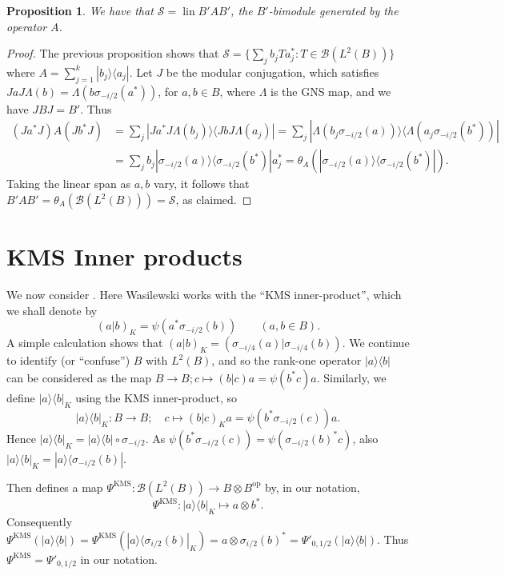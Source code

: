 \documentclass[a4paper,11pt]{article}
\theoremstyle{plain}
\newtheorem{proposition}{Proposition}[section]
\theoremstyle{remark}
\newcommand{\mc}[1]{\mathcal{#1}}
\newcommand{\lin}{\operatorname{lin}}
\newcommand{\op}{{\operatorname{op}}}
\newcommand{\KMS}{\textrm{KMS}}
\begin{document}
\begin{proposition}\label{prop:S_is_bimod_A}
We have that $\mc S = \lin B' A B'$, the $B'$-bimodule generated by the operator $A$.
\end{proposition}
\begin{proof}
The previous proposition shows that $\mc S = \{ \sum_j b_j T a_j^* : T\in\mc B(L^2(B)) \}$ where $A = \sum_{j=1}^k | b_j \rangle \langle a_j |$.  Let $J$ be the modular conjugation, which satisfies $JaJ \Lambda(b) = \Lambda(b \sigma_{-i/2}(a^*))$, for $a,b\in B$, where $\Lambda$ is the GNS map, and we have $JBJ=B'$.
Thus
\begin{align*}
(Ja^*J) A (Jb^*J)
&= \sum_j | Ja^*J\Lambda(b_j) \rangle \langle JbJ \Lambda(a_j) |
= \sum_j | \Lambda(b_j \sigma_{-i/2}(a)) \rangle \langle \Lambda(a_j \sigma_{-i/2}(b^*)) | \\
&= \sum_j b_j |\sigma_{-i/2}(a)\rangle\langle \sigma_{-i/2}(b^*)| a_j^*
= \theta_A(|\sigma_{-i/2}(a)\rangle\langle \sigma_{-i/2}(b^*)|).
\end{align*}
Taking the linear span as $a,b$ vary, it follows that $B' A B' = \theta_A(\mc B(L^2(B))) = \mc S$, as claimed.
\end{proof}



\section{KMS Inner products}

We now consider \cite{Wasilewski_Quantum_Cayley}.  Here Wasilewski works with the ``KMS inner-product'', which we shall denote by
\begin{equation}
(a|b)_K = \psi(a^* \sigma_{-i/2}(b)) \qquad (a,b\in B).
\label{eq:KMS_defn}
\end{equation}
A simple calculation shows that $(a|b)_K = (\sigma_{-i/4}(a)|\sigma_{-i/4}(b))$.  We continue to identify (or ``confuse'') $B$ with $L^2(B)$, and so the rank-one operator $|a\rangle\langle b|$ can be considered as the map $B\to B; c \mapsto (b|c) a = \psi(b^*c) a$.  Similarly, we define $|a\rangle\langle b|_K$ using the KMS inner-product, so
\[ |a\rangle\langle b|_K \colon B \to B; \quad c \mapsto (b|c)_K a =  \psi(b^* \sigma_{-i/2}(c)) a. \]
Hence $|a\rangle\langle b|_K = |a\rangle\langle b| \circ \sigma_{-i/2}$.  As $\psi(b^* \sigma_{-i/2}(c)) = \psi(\sigma_{-i/2}(b)^* c)$, also $|a\rangle\langle b|_K = |a\rangle\langle\sigma_{-i/2}(b)|$.

Then \cite[Lemma~3.3]{Wasilewski_Quantum_Cayley} defines a map $\Psi^{\KMS} \colon \mc B(L^2(B)) \to B\otimes B^\op$ by, in our notation,
\[ \Psi^{\KMS} \colon  |a\rangle\langle b|_K  \mapsto  a \otimes b^*. \]
Consequently $\Psi^{\KMS}(|a\rangle\langle b|) = \Psi^{\KMS}(|a\rangle\langle \sigma_{i/2}(b)|_K)= a \otimes \sigma_{i/2}(b)^* = \Psi'_{0, 1/2}(|a\rangle\langle b|)$.  Thus $\Psi^{\KMS} = \Psi'_{0,1/2}$ in our notation.
\end{document}
